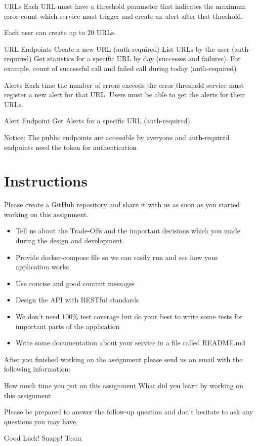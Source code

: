 \documentclass{article}
\begin{document}
URLs
Each URL must have a threshold parameter that indicates the maximum error count which service must trigger and create an alert after that threshold.

Each user can create up to 20 URLs.

URL Endpoints
Create a new URL (auth-required)
List URLs by the user (auth-required)
Get statistics for a specific URL by day (successes and failures). For example, count of successful call and failed call during today (auth-required)

Alerts
Each time the number of errors exceeds the error threshold service must register a new alert for that URL. Users must be able to get the alerts for their URLs.

Alert Endpoint
Get Alerts for a specific URL (auth-required)


Notice: The public endpoints are accessible by everyone and auth-required endpoints need the token for authentication

\section{Instructions}

Please create a GitHub repository and share it with us as soon as you started working on this assignment.

\begin{itemize}
  \item Tell us about the Trade-Offs and the important decisions which you made during the design and development.
  \item Provide docker-compose file so we can easily run and see how your application works
  \item Use concise and good commit messages
  \item Design the API with RESTful standards
  \item We don’t need 100\% test coverage but do your best to write some tests for important parts of the application
  \item Write some documentation about your service in a file called README.md
\end{itemize}

After you finished working on the assignment please send us an email with the following information:

How much time you put on this assignment
What did you learn by working on this assignment


Please be prepared to answer the follow-up question and don’t hesitate to ask any questions you may have.


Good Luck!
Snapp! Team
\end{document}
